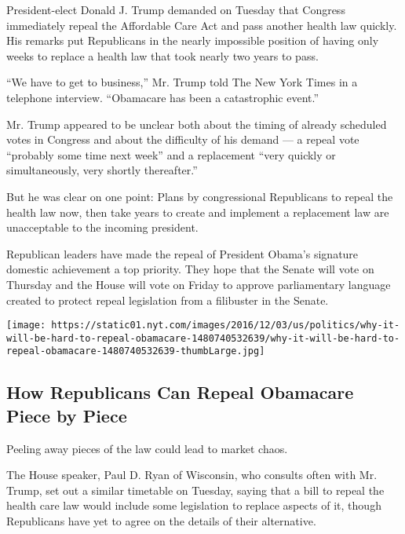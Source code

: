 President-elect Donald J. Trump demanded on Tuesday that Congress
immediately repeal the Affordable Care Act and pass another health law
quickly. His remarks put Republicans in the nearly impossible position
of having only weeks to replace a health law that took nearly two years
to pass.

``We have to get to business,'' Mr. Trump told The New York Times in a
telephone interview. ``Obamacare has been a catastrophic event.''

Mr. Trump appeared to be unclear both about the timing of already
scheduled votes in Congress and about the difficulty of his demand --- a
repeal vote ``probably some time next week'' and a replacement ``very
quickly or simultaneously, very shortly thereafter.''

But he was clear on one point: Plans by congressional Republicans to
repeal the health law now, then take years to create and implement a
replacement law are unacceptable to the incoming president.

Republican leaders have made the repeal of President Obama's signature
domestic achievement a top priority. They hope that the Senate will vote
on Thursday and the House will vote on Friday to approve parliamentary
language created to protect repeal legislation from a filibuster in the
Senate.

\href{https://www.nytimes.com/interactive/2016/12/03/us/politics/why-it-will-be-hard-to-repeal-obamacare.html}{}

\texttt{[image: https://static01.nyt.com/images/2016/12/03/us/politics/why-it-will-be-hard-to-repeal-obamacare-1480740532639/why-it-will-be-hard-to-repeal-obamacare-1480740532639-thumbLarge.jpg]}

\hypertarget{how-republicans-can-repeal-obamacare-piece-by-piece}{%
\subsection{How Republicans Can Repeal Obamacare Piece by
Piece}\label{how-republicans-can-repeal-obamacare-piece-by-piece}}

Peeling away pieces of the law could lead to market chaos.

The House speaker, Paul D. Ryan of Wisconsin, who consults often with
Mr. Trump, set out a similar timetable on Tuesday, saying that a bill to
repeal the health care law would include some legislation to replace
aspects of it, though Republicans have yet to agree on the details of
their alternative.

